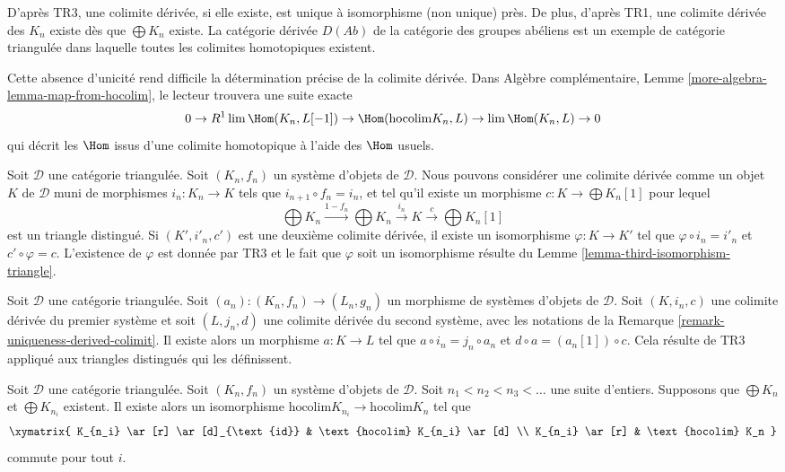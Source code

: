 \noindent
D'après TR3, une colimite dérivée, si elle existe, est unique à isomorphisme
(non unique) près. De plus, d'après TR1, une colimite dérivée des $K_n$ existe
dès que $\bigoplus K_n$ existe. La catégorie dérivée $D(\textit{Ab})$ de la
catégorie des groupes abéliens est un exemple de catégorie triangulée dans
laquelle toutes les colimites homotopiques existent.

\medskip\noindent
Cette absence d'unicité rend difficile la détermination précise de la
colimite dérivée. Dans Algèbre complémentaire, Lemme
\ref{more-algebra-lemma-map-from-hocolim}, le lecteur trouvera une suite exacte
$$
0 \to R^1\lim \Hom(K_n, L[-1]) \to \Hom(\text{hocolim} K_n, L)
\to \lim \Hom(K_n, L) \to 0
$$
qui décrit les $\Hom$ issus d'une colimite homotopique à l'aide des $\Hom$
usuels.

\begin{remark}
\label{remark-uniqueness-derived-colimit}
Soit $\mathcal{D}$ une catégorie triangulée.
Soit $(K_n, f_n)$ un système d'objets de $\mathcal{D}$.
Nous pouvons considérer une colimite dérivée comme un objet $K$ de
$\mathcal{D}$ muni de morphismes $i_n : K_n \to K$ tels que
$i_{n + 1} \circ f_n = i_n$, et tel qu'il existe un morphisme
$c : K \to \bigoplus K_n[1]$ pour lequel
$$
\bigoplus K_n \xrightarrow{1 - f_n} \bigoplus K_n \xrightarrow{i_n}
K \xrightarrow{c} \bigoplus K_n[1]
$$
est un triangle distingué. Si $(K', i'_n, c')$ est une deuxième colimite
dérivée, il existe un isomorphisme $\varphi : K \to K'$ tel que
$\varphi \circ i_n = i'_n$ et $c' \circ \varphi = c$.
L'existence de $\varphi$ est donnée par TR3 et le fait que $\varphi$ soit un
isomorphisme résulte du Lemme \ref{lemma-third-isomorphism-triangle}.
\end{remark}

\begin{remark}
\label{remark-functoriality-derived-colimit}
Soit $\mathcal{D}$ une catégorie triangulée.
Soit $(a_n) : (K_n, f_n) \to (L_n, g_n)$ un morphisme de systèmes d'objets de
$\mathcal{D}$. Soit $(K, i_n, c)$ une colimite dérivée du premier système et
soit $(L, j_n, d)$ une colimite dérivée du second système, avec les notations
de la Remarque \ref{remark-uniqueness-derived-colimit}.
Il existe alors un morphisme $a : K \to L$ tel que
$a \circ i_n = j_n \circ a_n$ et
$d \circ a = (a_n[1]) \circ c$.
Cela résulte de TR3 appliqué aux triangles distingués qui les définissent.
\end{remark}

\begin{lemma}
\label{lemma-hocolim-subsequence}
Soit $\mathcal{D}$ une catégorie triangulée.
Soit $(K_n, f_n)$ un système d'objets de $\mathcal{D}$.
Soit $n_1 < n_2 < n_3 < \ldots$ une suite d'entiers.
Supposons que $\bigoplus K_n$ et $\bigoplus K_{n_i}$ existent.
Il existe alors un isomorphisme
$\text{hocolim} K_{n_i} \to \text{hocolim} K_n$ tel que
$$
\xymatrix{
K_{n_i} \ar[r] \ar[d]_{\text{id}} & \text{hocolim} K_{n_i} \ar[d] \\
K_{n_i} \ar[r] & \text{hocolim} K_n
}
$$
commute pour tout $i$.
\end{lemma}

